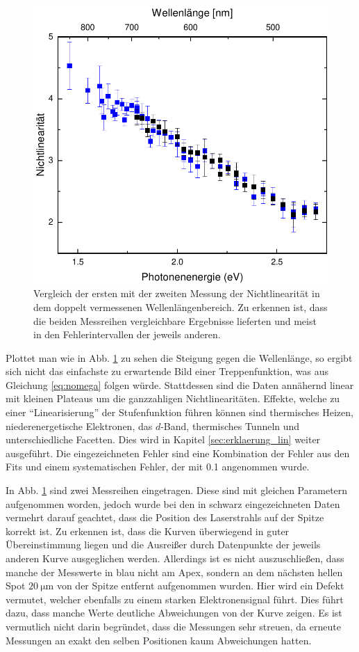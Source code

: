 \documentclass[bachelor,       %
               twoside,        %
               BCOR10mm,       %
               english,ngerman, %
               final,          %
               ]{GAUBM}
\begin{document}
\begin{figure}[h]
	\centering
	\includegraphics[width=0.8\linewidth]{Vergleich}
	\caption{Vergleich der ersten mit der zweiten Messung der Nichtlinearität in dem doppelt vermessenen Wellenlängenbereich. Zu erkennen ist, dass die beiden Messreihen vergleichbare Ergebnisse lieferten und meist in den Fehlerintervallen der jeweils anderen.}
	\label{fig:ges_messung}
\end{figure}

Plottet man wie in Abb. \ref{fig:ges_messung} zu sehen die Steigung gegen die Wellenlänge, so ergibt sich nicht das einfachste zu erwartende Bild einer Treppenfunktion, was aus Gleichung \ref{eq:nomega} folgen würde.
Stattdessen sind die Daten annähernd linear mit kleinen Plateaus um die ganzzahligen Nichtlinearitäten.
Effekte, welche zu einer ``Linearisierung'' der Stufenfunktion führen können sind thermisches Heizen, niederenergetische Elektronen, das $d$-Band, thermisches Tunneln und unterschiedliche Facetten.
Dies wird in Kapitel \ref{sec:erklaerung_lin} weiter ausgeführt.
Die eingezeichneten Fehler sind eine Kombination der Fehler aus den Fits und einem systematischen Fehler, der mit 0.1 angenommen wurde.

\newpage
In Abb. \ref{fig:ges_messung} sind zwei Messreihen eingetragen.
Diese sind mit gleichen Parametern aufgenommen worden, jedoch wurde bei den in schwarz eingezeichneten Daten vermehrt darauf geachtet, dass die Position des Laserstrahls auf der Spitze korrekt ist.
Zu erkennen ist, dass die Kurven überwiegend in guter Übereinstimmung liegen und die Ausreißer durch Datenpunkte der jeweils anderen Kurve ausgeglichen werden.
Allerdings ist es nicht auszuschließen, dass manche der Messwerte in blau nicht am Apex, sondern an dem nächsten hellen Spot $\SI{20}{\micro\meter}$ von der Spitze entfernt aufgenommen wurden.
Hier wird ein Defekt vermutet, welcher ebenfalls zu einem starken Elektronensignal führt.
Dies führt dazu, dass manche Werte deutliche Abweichungen von der Kurve zeigen.
Es ist vermutlich nicht darin begründet, dass die Messungen sehr streuen, da erneute Messungen an exakt den selben Positionen kaum Abweichungen hatten.\\\\
\end{document}
